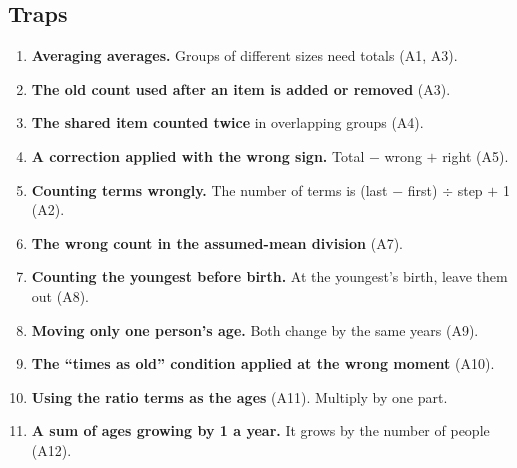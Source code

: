 \documentclass[11pt,a4paper]{article}
\let\oldsubsection\subsection
\renewcommand{\subsection}{\needspace{9\baselineskip}\oldsubsection}
\begin{document}
\subsection*{Traps}
\begin{enumerate}
\item \textbf{Averaging averages.} Groups of different sizes need totals (A1, A3).
\item \textbf{The old count used after an item is added or removed} (A3).
\item \textbf{The shared item counted twice} in overlapping groups (A4).
\item \textbf{A correction applied with the wrong sign.} Total $-$ wrong $+$ right (A5).
\item \textbf{Counting terms wrongly.} The number of terms is (last $-$ first) $\div$ step $+$ 1 (A2).
\item \textbf{The wrong count in the assumed-mean division} (A7).
\item \textbf{Counting the youngest before birth.} At the youngest's birth, leave them out (A8).
\item \textbf{Moving only one person's age.} Both change by the same years (A9).
\item \textbf{The ``times as old'' condition applied at the wrong moment} (A10).
\item \textbf{Using the ratio terms as the ages} (A11). Multiply by one part.
\item \textbf{A sum of ages growing by 1 a year.} It grows by the number of people (A12).
\end{enumerate}
\end{document}
